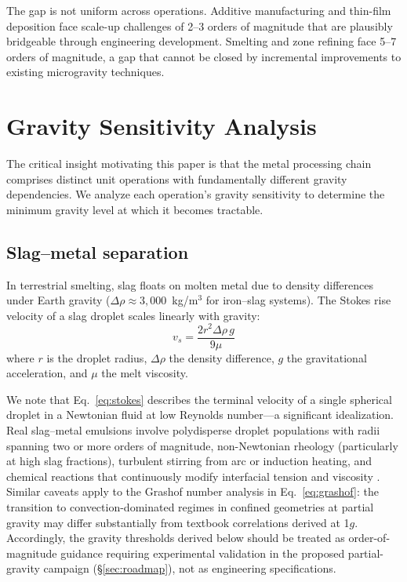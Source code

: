 \documentclass[preprint,12pt]{elsarticle}
\begin{document}
The gap is not uniform across operations. Additive manufacturing and thin-film deposition face scale-up challenges of 2--3 orders of magnitude that are plausibly bridgeable through engineering development. Smelting and zone refining face 5--7 orders of magnitude, a gap that cannot be closed by incremental improvements to existing microgravity techniques.

\section{Gravity Sensitivity Analysis}
\label{sec:gravity-sensitivity}

The critical insight motivating this paper is that the metal processing chain comprises distinct unit operations with fundamentally different gravity dependencies. We analyze each operation's gravity sensitivity to determine the minimum gravity level at which it becomes tractable.

\subsection{Slag--metal separation}

In terrestrial smelting, slag floats on molten metal due to density differences under Earth gravity ($\Delta\rho \approx 3{,}000$~kg/m$^3$ for iron--slag systems). The Stokes rise velocity of a slag droplet scales linearly with gravity:
\begin{equation}
    v_s = \frac{2 r^2 \Delta\rho\, g}{9 \mu}
    \label{eq:stokes}
\end{equation}
where $r$ is the droplet radius, $\Delta\rho$ the density difference, $g$ the gravitational acceleration, and $\mu$ the melt viscosity.

We note that Eq.~\eqref{eq:stokes} describes the terminal velocity of a single spherical droplet in a Newtonian fluid at low Reynolds number---a significant idealization. Real slag--metal emulsions involve polydisperse droplet populations with radii spanning two or more orders of magnitude, non-Newtonian rheology (particularly at high slag fractions), turbulent stirring from arc or induction heating, and chemical reactions that continuously modify interfacial tension and viscosity \cite{dold1997,luo2023}. Similar caveats apply to the Grashof number analysis in Eq.~\eqref{eq:grashof}: the transition to convection-dominated regimes in confined geometries at partial gravity may differ substantially from textbook correlations derived at 1$g$. Accordingly, the gravity thresholds derived below should be treated as order-of-magnitude guidance requiring experimental validation in the proposed partial-gravity campaign (\S\ref{sec:roadmap}), not as engineering specifications.
\end{document}
